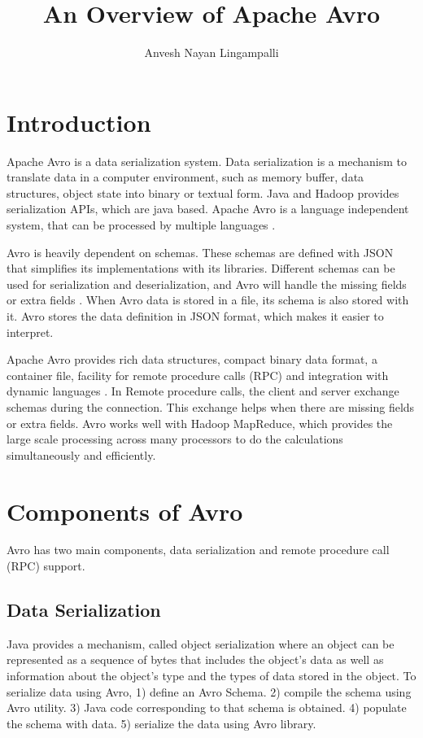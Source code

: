 \documentclass[9pt,twocolumn,twoside]{../../styles/osajnl}
\title{An Overview of Apache Avro}
\author[1]{Anvesh Nayan Lingampalli}
\affil[1]{School of Informatics and Computing, Bloomington, IN 47408, U.S.A.}
\affil[*]{Corresponding authors: anveling@umail.iu.edu}
\begin{document}
\maketitle

\section{Introduction} 

Apache Avro \cite{www-apache-avro} is a data serialization system. Data serialization is a
mechanism to translate data in a computer environment, such as memory
buffer, data structures, object state into binary or textual form.
Java and Hadoop provides serialization APIs, which are java
based. Apache Avro is a language independent system, that can be
processed by multiple languages \cite{www-doc-avro}.

Avro is heavily dependent on schemas. These schemas are defined with
JSON that simplifies its implementations with its libraries. Different
schemas can be used for serialization and deserialization, and Avro
will handle the missing fields or extra fields
\cite{www-tutorialspoint-avro}. When Avro data is stored in a file,
its schema is also stored with it. Avro stores the data definition in
JSON format, which makes it easier to interpret.

Apache Avro provides rich data structures, compact binary data format,
a container file, facility for remote procedure calls (RPC) and
integration with dynamic languages \cite{www-apache-avro}. In Remote procedure calls, the
client and server exchange schemas during the connection. This
exchange helps when there are missing fields or extra fields. Avro
works well with Hadoop MapReduce, which provides the large scale
processing across many processors to do the calculations
simultaneously and efficiently.

\section{Components of Avro}

Avro has two main components, data serialization and remote procedure
call (RPC) support.\cite{www-using-avro}

\subsection{Data Serialization}

Java provides a mechanism, called object serialization where an object
can be represented as a sequence of bytes that includes the object's
data as well as information about the object's type and the types of
data stored in the object. To serialize data using Avro,
1) define an Avro Schema.
2) compile the schema using Avro utility.
3) Java code corresponding to that schema is obtained.
4) populate the schema with data.
5) serialize the data using Avro library\cite{www-avro-serialzation}.
\end{document}
